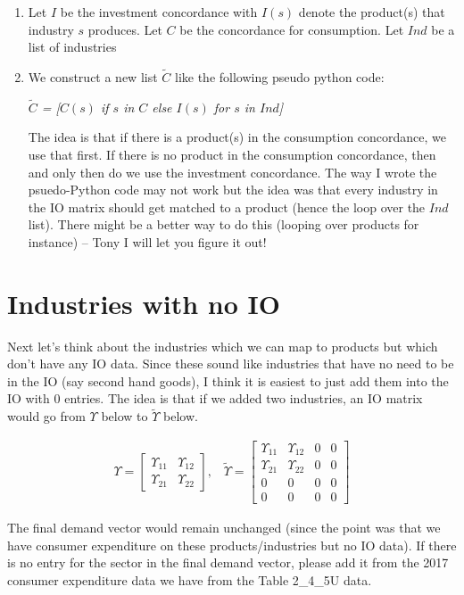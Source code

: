 \documentclass[12pt,english]{article}
\begin{document}
\begin{enumerate}
	\item Let $I$ be the investment concordance with $I(s)$ denote the product(s) that industry $s$ produces. Let $C$ be the concordance for consumption. Let $Ind$ be a list of industries
	\item We construct a new list $\tilde{C}$ like the following pseudo python code:
	
	
	\emph{$\tilde{C}$ = [$C(s)$ if $s$ in $C$ else $I(s)$ for $s$ in $Ind$]}
	
	The idea is that if there is a product(s) in the consumption concordance, we use that first. If there is no product in the consumption concordance, then and only then do we use the investment concordance. The way I wrote the psuedo-Python code may not work but the idea was that every industry in the IO matrix should get matched to a product (hence the loop over the $Ind$ list). There might be a better way to do this (looping over products for instance) -- Tony I will let you figure it out!
\end{enumerate}

\section{Industries with no IO}

Next let's think about the industries which we can map to products but which don't have any IO data. Since these sound like industries that have no need to be in the IO (say second hand goods), I think it is easiest to just add them into the IO with 0 entries. The idea is that if we added two industries, an IO matrix would go from $\Upsilon$ below to $\tilde{\Upsilon}$ below.

\begin{align*}
	\Upsilon = \begin{bmatrix} 
	\Upsilon_11 & \Upsilon_{12}\\
	\Upsilon_{21} & \Upsilon_{22}
	\end{bmatrix},\;\;\;	\tilde{\Upsilon} = \begin{bmatrix} 
	\Upsilon_11 & \Upsilon_{12}&0&0\\
	\Upsilon_{21} & \Upsilon_{22}&0&0\\
	0&0&0&0\\
	0&0&0&0
	\end{bmatrix}
\end{align*}

The final demand vector would remain unchanged (since the point was that we have consumer expenditure on these products/industries but no IO data). If there is no entry for the sector in the final demand vector, please add it from the 2017 consumer expenditure data we have from the Table 2\_4\_5U data.
\end{document}
